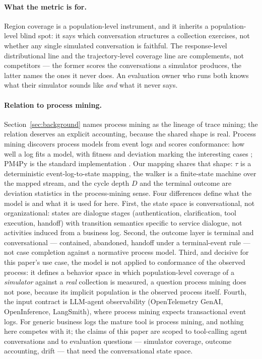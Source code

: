 \paragraph{What the metric is for.}
Region coverage is a population-level instrument, and it inherits a population-level blind
spot: it says which conversation structures a collection exercises, not whether any single
simulated conversation is faithful.
The response-level distributional line \citep{distributionalGap2026,cds2026,mirrorbench2026}
and the trajectory-level coverage line are complements, not competitors --- the former
scores the conversations a simulator produces, the latter names the ones it never does.
An evaluation owner who runs both knows what their simulator sounds like \emph{and} what it
never says.

\paragraph{Relation to process mining.}
Section~\ref{sec:background} names process mining as the lineage of trace mining; the relation
deserves an explicit accounting, because the shared shape is real.
Process mining discovers process models from event logs and scores conformance: how well a log
fits a model, with fitness and deviation marking the interesting cases
\citep{vanDerAalst2012process,carmona2018conformance}; PM4Py is the standard implementation
\citep{berti2019pm4py}.
Our mapping shares that shape: $\tau$ is a deterministic event-log-to-state mapping, the walker
is a finite-state machine over the mapped stream, and the cycle depth $D$ and the terminal
outcome are deviation statistics in the process-mining sense.
Four differences define what the model is and what it is used for here.
First, the state space is conversational, not organizational: states are dialogue stages
(authentication, clarification, tool execution, handoff) with transition semantics specific to
service dialogue, not activities induced from a business log.
Second, the outcome layer is terminal and conversational --- contained, abandoned, handoff
under a terminal-event rule --- not case completion against a normative process model.
Third, and decisive for this paper's use case, the model is not applied to conformance of the
observed process: it defines a behavior space in which population-level coverage of a
\emph{simulator} against a \emph{real} collection is measured, a question process mining does
not pose, because its implicit population is the observed process itself.
Fourth, the input contract is LLM-agent observability (OpenTelemetry GenAI, OpenInference,
LangSmith), where process mining expects transactional event logs.
For generic business logs the mature tool is process mining, and nothing here competes with
it; the claims of this paper are scoped to tool-calling agent conversations and to evaluation
questions --- simulator coverage, outcome accounting, drift --- that need the conversational
state space.

